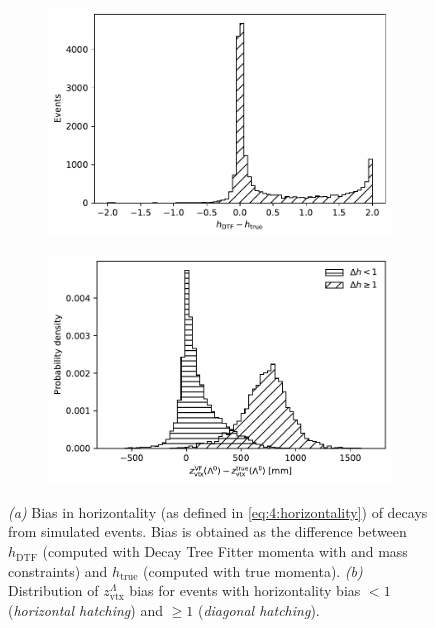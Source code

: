 \begin{figure}[t]
	\centering
	\begin{subfigure}{.45\textwidth}
		\includegraphics[width=\textwidth]{graphics/05-angular_distributions/Lambda_horizontality_bias.pdf}
		\caption{}
		\label{fig:5:horizontality_bias}
	\end{subfigure}
	\begin{subfigure}{.45\textwidth}
		\includegraphics[width=\textwidth]{graphics/05-angular_distributions/lambda_endvertex_z_bias_vs_horizontality_bias.pdf}
		\caption{}
		\label{fig:5:lz_endvertex_bias_vs_horizontality_bias}
	\end{subfigure}
	\caption{\textit{(a)} Bias in horizontality (as defined in \eqref{eq:4:horizontality}) of \lambdadecay decays from simulated \demonstratorshort events. Bias is obtained as the difference between $h_\text{DTF}$ (computed with Decay Tree Fitter momenta with \jpsi and \lz mass constraints) and $h_\text{true}$ (computed with true momenta). \textit{(b)} Distribution of $z_\text{vtx}^\Lambda$ bias for events with horizontality bias $<1$ (\textit{horizontal hatching}) and $\geq 1$ (\textit{diagonal hatching}).}
\end{figure}

